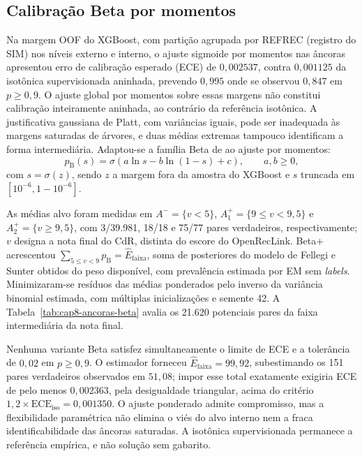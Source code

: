 \subsection{Calibração Beta por momentos}
\label{sec:e4-calibracao-beta}

Na margem OOF do XGBoost, com partição agrupada por REFREC (registro do SIM) nos níveis externo e interno, o ajuste sigmoide por momentos nas âncoras apresentou erro de calibração esperado (ECE) de $0{,}002537$, contra $0{,}001125$ da isotônica supervisionada aninhada, prevendo $0{,}995$ onde se observou $0{,}847$ em $p\geq0{,}9$. O ajuste global por momentos sobre essas margens não constitui calibração inteiramente aninhada, ao contrário da referência isotônica. A justificativa gaussiana de Platt, com variâncias iguais, pode ser inadequada às margens saturadas de árvores, e duas médias extremas tampouco identificam a forma intermediária. Adaptou-se a família Beta de  ao ajuste por momentos:
\begin{equation}
p_{\mathrm{B}}(s)=\sigma\!\left(a\ln s-b\ln(1-s)+c\right),
\qquad a,b\geq0,
\label{eq:cap8-beta-momentos}
\end{equation}
com $s=\sigma(z)$, sendo $z$ a margem fora da amostra do XGBoost e $s$ truncada em $[10^{-6},1-10^{-6}]$.

As médias alvo foram medidas em $A^- = \{v<5\}$, $A^+_1=\{9\leq v<9{,}5\}$ e $A^+_2=\{v\geq9{,}5\}$, com 3/39.981, 18/18 e 75/77 pares verdadeiros, respectivamente; $v$ designa a nota final do CdR, distinta do escore do OpenRecLink. Beta+ acrescentou $\sum_{5\leq v<9}p_{\mathrm{B}}=\widehat{E}_{\mathrm{faixa}}$, soma de posteriores do modelo de Fellegi e Sunter obtidos do peso disponível, com prevalência estimada por EM sem \textit{labels}. Minimizaram-se resíduos das médias ponderados pelo inverso da variância binomial estimada, com múltiplas inicializações e semente 42. A Tabela~\ref{tab:cap8-ancoras-beta} avalia os 21.620 potenciais pares da faixa intermediária da nota final.



Nenhuma variante Beta satisfez simultaneamente o limite de ECE e a tolerância de $0{,}02$ em $p\geq0{,}9$. O estimador forneceu $\widehat{E}_{\mathrm{faixa}}=99{,}92$, subestimando os 151 pares verdadeiros observados em $51{,}08$; impor esse total exatamente exigiria ECE de pelo menos $0{,}002363$, pela desigualdade triangular, acima do critério $1{,}2\times\mathrm{ECE}_{\mathrm{iso}}=0{,}001350$. O ajuste ponderado admite compromisso, mas a flexibilidade paramétrica não elimina o viés do alvo interno nem a fraca identificabilidade das âncoras saturadas. A isotônica supervisionada permanece a referência empírica, e não solução sem gabarito.

